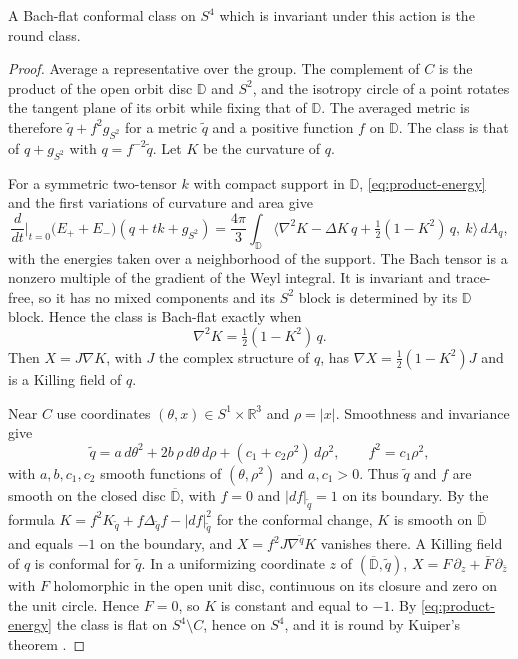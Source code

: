 \begin{proposition}
\label{prop:symmetric-critical}
A Bach-flat conformal class on \(S^4\) which is invariant under this
action is the round class.
\end{proposition}
\begin{proof}
Average a representative over the group. The complement of \(C\) is the
product of the open orbit disc \(\mathbb D\) and \(S^2\), and the
isotropy circle of a point rotates the tangent plane of its orbit while
fixing that of \(\mathbb D\). The averaged metric is therefore
\(\tilde q+f^2g_{S^2}\) for a metric \(\tilde q\) and a positive
function \(f\) on \(\mathbb D\). The class is that of \(q+g_{S^2}\)
with \(q=f^{-2}\tilde q\). Let \(K\) be the curvature of \(q\).

For a symmetric two-tensor \(k\) with compact support in \(\mathbb D\),
\eqref{eq:product-energy} and the first variations of curvature and
area give
\[
 \frac{d}{dt}\Big|_{t=0}\big(E_++E_-\big)(q+tk+g_{S^2})
 =\frac{4\pi}{3}\int_{\mathbb D}\big\langle
   \nabla^2K-\Delta K\,q+\tfrac12(1-K^2)\,q,\ k\big\rangle\,dA_q ,
\]
with the energies taken over a neighborhood of the support. The Bach
tensor is a nonzero multiple of the gradient of the Weyl integral. It is
invariant and trace-free, so it has no mixed components and its \(S^2\)
block is determined by its \(\mathbb D\) block. Hence the class is
Bach-flat exactly when
\begin{equation}\label{eq:hessian-K}
 \nabla^2K=\tfrac12(1-K^2)\,q .
\end{equation}
Then \(X=J\nabla K\), with \(J\) the complex structure of \(q\), has
\(\nabla X=\tfrac12(1-K^2)J\) and is a Killing field of \(q\).

Near \(C\) use coordinates \((\theta,x)\in S^1\times\mathbb R^3\) and
\(\rho=|x|\). Smoothness and invariance give
\[
 \tilde q=a\,d\theta^2+2b\,\rho\,d\theta\,d\rho
          +(c_1+c_2\rho^2)\,d\rho^2,\qquad f^2=c_1\rho^2 ,
\]
with \(a,b,c_1,c_2\) smooth functions of \((\theta,\rho^2)\) and
\(a,c_1>0\). Thus \(\tilde q\) and \(f\) are smooth on the closed disc
\(\overline{\mathbb D}\), with \(f=0\) and \(|df|_{\tilde q}=1\) on its
boundary. By the formula
\(K=f^2K_{\tilde q}+f\Delta_{\tilde q}f-|df|^2_{\tilde q}\) for the
conformal change, \(K\) is smooth on \(\overline{\mathbb D}\) and equals
\(-1\) on the boundary, and \(X=f^2J\nabla^{\tilde q}K\) vanishes there.
A Killing field of \(q\) is conformal for \(\tilde q\). In a
uniformizing coordinate \(z\) of \((\overline{\mathbb D},\tilde q)\),
\(X=F\,\partial_z+\bar F\,\partial_{\bar z}\) with \(F\) holomorphic in
the open unit disc, continuous on its closure and zero on the unit
circle. Hence \(F=0\), so \(K\) is constant and equal to \(-1\). By
\eqref{eq:product-energy} the class is flat on \(S^4\setminus C\), hence
on \(S^4\), and it is round by Kuiper's theorem \cite{Kuiper1949}.
\end{proof}

